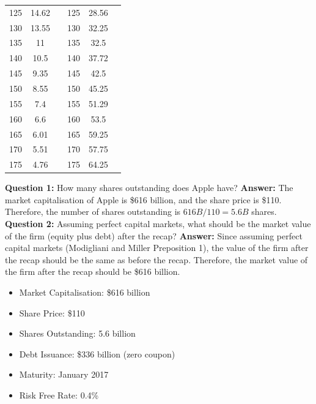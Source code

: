 \begin{table}[htbp]
\begin{tabular}{ccc|ccc}
    125 & 14.62 & & 125 & 28.56 & \\
    130 & 13.55 & & 130 & 32.25 & \\
    135 & 11    & & 135 & 32.5  & \\
    140 & 10.5  & & 140 & 37.72 & \\
    145 & 9.35  & & 145 & 42.5  & \\
    150 & 8.55  & & 150 & 45.25 & \\
    155 & 7.4   & & 155 & 51.29 & \\
    160 & 6.6   & & 160 & 53.5  & \\
    165 & 6.01  & & 165 & 59.25 & \\
    170 & 5.51  & & 170 & 57.75 & \\
    175 & 4.76  & & 175 & 64.25 & \\
    \bottomrule
    \end{tabular}
    \end{table}
    
\textbf{Question 1: }
How many shares outstanding does Apple have?
\textbf{Answer: }
The market capitalisation of Apple is \$616 billion, and the share price is \$110. Therefore, the number of shares outstanding is $616B/110 = 5.6B$ shares.\\

\textbf{Question 2: }
Assuming perfect capital markets, what should be the market value of the firm (equity plus debt) after the recap?
\textbf{Answer: }
Since assuming perfect capital markets (Modigliani and Miller Preposition 1), the value of the firm after the recap should be the same as before the recap. Therefore, the market value of the firm after the recap should be \$616 billion.


\begin{itemize}
    \item Market Capitalisation: \$616 billion
    \item Share Price: \$110
    \item Shares Outstanding: 5.6 billion
    \item Debt Issuance: \$336 billion (zero coupon)
    \item Maturity: January 2017
    \item Risk Free Rate: 0.4\%
\end{itemize}



